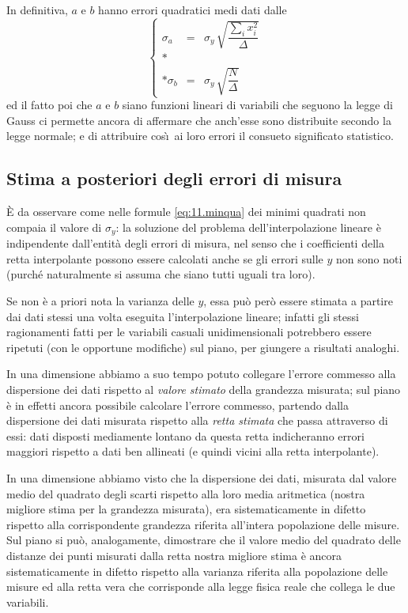 In definitiva, $a$ e $b$ hanno errori quadratici medi dati
dalle
\begin{equation} \label{eq:11.errab}
  \left \{ \begin{array}{ccl}
    \sigma_{a} & = & \sigma_{y} \, \sqrt{
      \dfrac{\sum \nolimits_i x_i^2}
      {\Delta} } \\*
   & & \\*
   \sigma_{b} & = & \sigma_{y} \, \sqrt{
     \dfrac{N}{\Delta} }
   \end{array} \right.
\end{equation}
ed il fatto poi che $a$ e $b$ siano funzioni lineari di
variabili che seguono la legge di Gauss ci permette ancora
di affermare che anch'esse sono distribuite secondo la legge
normale; e di attribuire cos\`\i\ ai loro errori il consueto
significato statistico.%

\subsection{Stima a posteriori degli errori di misura}%
%
\label{ch:11.fisher}
\`E da osservare come nelle formule \eqref{eq:11.minqua} dei
minimi quadrati non compaia il valore di $\sigma_y$: la
soluzione del problema dell'interpolazione lineare \`e
indipendente dall'entit\`a degli errori di misura, nel senso
che i coefficienti della retta interpolante possono essere
calcolati anche se gli errori sulle $y$ non sono noti
(purch\'e naturalmente si assuma che siano tutti uguali tra
loro).

Se non \`e a priori nota la varianza delle $y$, essa pu\`o
per\`o essere stimata a partire dai dati stessi una volta
eseguita l'interpolazione lineare; infatti gli stessi
ragionamenti fatti per le variabili casuali unidimensionali
potrebbero essere ripetuti (con le opportune modifiche) sul
piano, per giungere a risultati analoghi.

In una dimensione abbiamo a suo tempo potuto collegare
l'errore commesso alla dispersione dei dati rispetto al
\emph{valore stimato} della grandezza misurata; sul piano
\`e in effetti ancora possibile calcolare l'errore commesso,
partendo dalla dispersione dei dati misurata rispetto alla
\emph{retta stimata} che passa attraverso di essi: dati
disposti mediamente lontano da questa retta indicheranno
errori maggiori rispetto a dati ben allineati (e quindi
vicini alla retta interpolante).

In una dimensione abbiamo visto che la dispersione dei dati,
misurata dal valore medio del quadrato degli scarti rispetto
alla loro media aritmetica (nostra migliore stima per la
grandezza misurata), era sistematicamente in difetto
rispetto alla corrispondente grandezza riferita all'intera
popolazione delle misure.  Sul piano si pu\`o, analogamente,
dimostrare che il valore medio del quadrato delle distanze
dei punti misurati dalla retta nostra migliore stima \`e
ancora sistematicamente in difetto rispetto alla varianza
riferita alla popolazione delle misure ed alla retta vera
che corrisponde alla legge fisica reale che collega le due
variabili.

